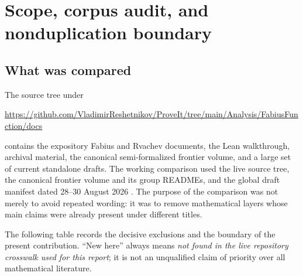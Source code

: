 \documentclass[11pt,a4paper]{article}
\theoremstyle{definition}
\begin{document}
\tableofcontents
\newpage

\section{Scope, corpus audit, and nonduplication boundary}
\label{sec:audit}

\subsection{What was compared}

The source tree under
\begin{center}
\url{https://github.com/VladimirReshetnikov/ProveIt/tree/main/Analysis/FabiusFunction/docs}
\end{center}
contains the expository Fabius and Rvachev documents, the Lean walkthrough,
archival material, the canonical semi-formalized frontier volume, and a large
set of current standalone drafts.  The working comparison used the live
source tree, the canonical frontier volume and its group READMEs, and the
global draft manifest dated 28--30 August 2026 \cite{ProveItDocs,ProveItManifest}.  The purpose of the comparison
was not merely to avoid repeated wording: it was to remove mathematical
layers whose main claims were already present under different titles.

The following table records the decisive exclusions and the boundary of the
present contribution.  ``New here'' always means \emph{not found in the live
repository crosswalk used for this report}; it is not an unqualified claim of
priority over all mathematical literature.
\end{document}
